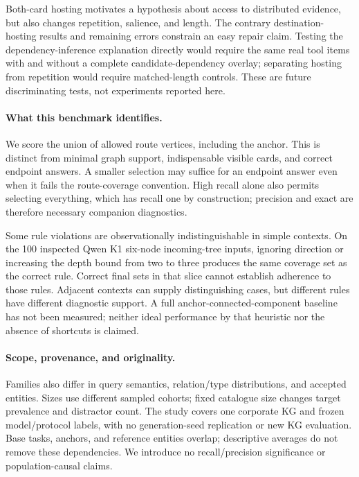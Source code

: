 Both-card hosting motivates a hypothesis about access to distributed evidence, but also changes repetition, salience, and length. The contrary destination-hosting results and remaining errors constrain an easy repair claim. Testing the dependency-inference explanation directly would require the same real tool items with and without a complete candidate-dependency overlay; separating hosting from repetition would require matched-length controls. These are future discriminating tests, not experiments reported here.

\paragraph{What this benchmark identifies.}
We score the union of allowed route vertices, including the anchor. This is distinct from minimal graph support, indispensable visible cards, and correct endpoint answers. A smaller selection may suffice for an endpoint answer even when it fails the route-coverage convention. High recall alone also permits selecting everything, which has recall one by construction; precision and exact are therefore necessary companion diagnostics.

Some rule violations are observationally indistinguishable in simple contexts. On the 100 inspected Qwen K1 six-node incoming-tree inputs, ignoring direction or increasing the depth bound from two to three produces the same coverage set as the correct rule. Correct final sets in that slice cannot establish adherence to those rules. Adjacent contexts can supply distinguishing cases, but different rules have different diagnostic support. A full anchor-connected-component baseline has not been measured; neither ideal performance by that heuristic nor the absence of shortcuts is claimed.

\paragraph{Scope, provenance, and originality.}
Families also differ in query semantics, relation/type distributions, and accepted entities. Sizes use different sampled cohorts; fixed catalogue size changes target prevalence and distractor count. The study covers one corporate KG and frozen model/protocol labels, with no generation-seed replication or new KG evaluation. Base tasks, anchors, and reference entities overlap; descriptive averages do not remove these dependencies. We introduce no recall/precision significance or population-causal claims.

